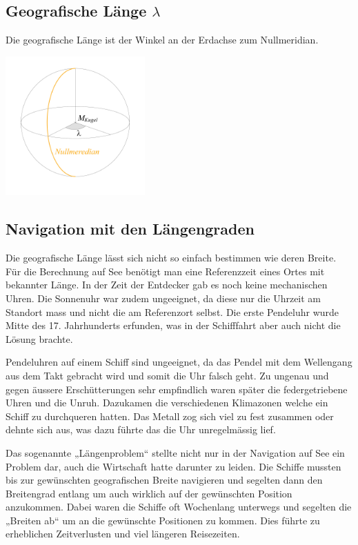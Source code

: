 \begin{refsection}
\subsection{Geografische Länge $\lambda$}
\begin{definition}
Die geografische Länge ist der Winkel an der Erdachse zum Nullmeridian.
\end{definition}

\begin{center}
        \includegraphics[width=0.4\textwidth]{kugel/GeografischeLaenge.jpg}
\end{center}

\subsection{Navigation mit den Längengraden}
Die geografische Länge lässt sich nicht so einfach bestimmen wie deren Breite.
Für die Berechnung auf See benötigt man eine Referenzzeit eines Ortes mit bekannter Länge.
In der Zeit der Entdecker gab es noch keine mechanischen Uhren. Die Sonnenuhr war zudem ungeeignet, da diese nur die Uhrzeit am Standort mass und nicht die am Referenzort selbst. Die erste Pendeluhr wurde Mitte des 17. Jahrhunderts erfunden, was in der Schifffahrt aber auch nicht die Lösung brachte.

Pendeluhren auf einem Schiff sind ungeeignet, da das Pendel mit dem Wellengang aus dem Takt gebracht wird und somit die Uhr falsch geht.
Zu ungenau und gegen äussere Erschütterungen sehr empfindlich waren später die federgetriebene Uhren und die Unruh. Dazukamen die verschiedenen Klimazonen welche ein Schiff zu durchqueren hatten. Das Metall zog sich viel zu fest zusammen oder dehnte sich aus, was dazu führte das die Uhr unregelmässig lief.

Das sogenannte „Längenproblem“ stellte nicht nur in der Navigation auf See ein Problem dar, auch die Wirtschaft hatte darunter zu leiden. Die Schiffe mussten bis zur gewünschten geografischen Breite navigieren und segelten dann den Breitengrad entlang um auch wirklich auf der gewünschten Position anzukommen. Dabei waren die Schiffe oft Wochenlang unterwegs und segelten die „Breiten ab“ um an die gewünschte Positionen zu kommen. Dies führte zu erheblichen Zeitverlusten und viel längeren Reisezeiten.




\end{refsection}
